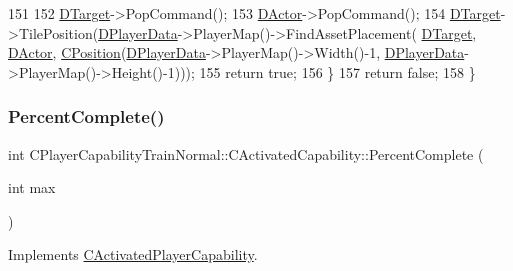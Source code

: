 \begin{DoxyCode}
151         
152         \hyperlink{classCActivatedPlayerCapability_a8a1cf50b6501bcfd55af0c935828e395}{DTarget}->PopCommand();
153         \hyperlink{classCActivatedPlayerCapability_a54ca944b47bff2718330639941d402b0}{DActor}->PopCommand();
154         \hyperlink{classCActivatedPlayerCapability_a8a1cf50b6501bcfd55af0c935828e395}{DTarget}->TilePosition(\hyperlink{classCActivatedPlayerCapability_a9bf27c322a73f4b11c8183cc1973c3d8}{DPlayerData}->PlayerMap()->FindAssetPlacement(
      \hyperlink{classCActivatedPlayerCapability_a8a1cf50b6501bcfd55af0c935828e395}{DTarget}, \hyperlink{classCActivatedPlayerCapability_a54ca944b47bff2718330639941d402b0}{DActor}, \hyperlink{classCPosition}{CPosition}(\hyperlink{classCActivatedPlayerCapability_a9bf27c322a73f4b11c8183cc1973c3d8}{DPlayerData}->PlayerMap()->Width()-1, 
      \hyperlink{classCActivatedPlayerCapability_a9bf27c322a73f4b11c8183cc1973c3d8}{DPlayerData}->PlayerMap()->Height()-1)));
155         \textcolor{keywordflow}{return} \textcolor{keyword}{true};    
156     \}
157     \textcolor{keywordflow}{return} \textcolor{keyword}{false};
158 \}
\end{DoxyCode}
\hypertarget{classCPlayerCapabilityTrainNormal_1_1CActivatedCapability_ac0d2dd8e1b3aedb0873149ba4c92e6f7}{}\label{classCPlayerCapabilityTrainNormal_1_1CActivatedCapability_ac0d2dd8e1b3aedb0873149ba4c92e6f7} 
\subsubsection{\texorpdfstring{Percent\+Complete()}{PercentComplete()}}
{\footnotesize\ttfamily int C\+Player\+Capability\+Train\+Normal\+::\+C\+Activated\+Capability\+::\+Percent\+Complete (\begin{DoxyParamCaption}\item[{int}]{max }\end{DoxyParamCaption})\hspace{0.3cm}{\ttfamily [virtual]}}



Implements \hyperlink{classCActivatedPlayerCapability_a405dc6076058006a4f801727de4cfe4d}{C\+Activated\+Player\+Capability}.



